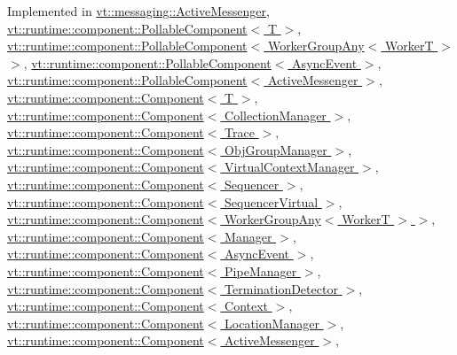 Implemented in \hyperlink{structvt_1_1messaging_1_1_active_messenger_a4cd83c125e144ecbd9425fa7cd194538}{vt\+::messaging\+::\+Active\+Messenger}, \hyperlink{structvt_1_1runtime_1_1component_1_1_pollable_component_a34cad810026224d550cd9b0c9d1eff22}{vt\+::runtime\+::component\+::\+Pollable\+Component$<$ T $>$}, \hyperlink{structvt_1_1runtime_1_1component_1_1_pollable_component_a34cad810026224d550cd9b0c9d1eff22}{vt\+::runtime\+::component\+::\+Pollable\+Component$<$ Worker\+Group\+Any$<$ Worker\+T $>$ $>$}, \hyperlink{structvt_1_1runtime_1_1component_1_1_pollable_component_a34cad810026224d550cd9b0c9d1eff22}{vt\+::runtime\+::component\+::\+Pollable\+Component$<$ Async\+Event $>$}, \hyperlink{structvt_1_1runtime_1_1component_1_1_pollable_component_a34cad810026224d550cd9b0c9d1eff22}{vt\+::runtime\+::component\+::\+Pollable\+Component$<$ Active\+Messenger $>$}, \hyperlink{structvt_1_1runtime_1_1component_1_1_component_a1dab11d9eb5bed8dfd5a3bb8fdf67f5a}{vt\+::runtime\+::component\+::\+Component$<$ T $>$}, \hyperlink{structvt_1_1runtime_1_1component_1_1_component_a1dab11d9eb5bed8dfd5a3bb8fdf67f5a}{vt\+::runtime\+::component\+::\+Component$<$ Collection\+Manager $>$}, \hyperlink{structvt_1_1runtime_1_1component_1_1_component_a1dab11d9eb5bed8dfd5a3bb8fdf67f5a}{vt\+::runtime\+::component\+::\+Component$<$ Trace $>$}, \hyperlink{structvt_1_1runtime_1_1component_1_1_component_a1dab11d9eb5bed8dfd5a3bb8fdf67f5a}{vt\+::runtime\+::component\+::\+Component$<$ Obj\+Group\+Manager $>$}, \hyperlink{structvt_1_1runtime_1_1component_1_1_component_a1dab11d9eb5bed8dfd5a3bb8fdf67f5a}{vt\+::runtime\+::component\+::\+Component$<$ Virtual\+Context\+Manager $>$}, \hyperlink{structvt_1_1runtime_1_1component_1_1_component_a1dab11d9eb5bed8dfd5a3bb8fdf67f5a}{vt\+::runtime\+::component\+::\+Component$<$ Sequencer $>$}, \hyperlink{structvt_1_1runtime_1_1component_1_1_component_a1dab11d9eb5bed8dfd5a3bb8fdf67f5a}{vt\+::runtime\+::component\+::\+Component$<$ Sequencer\+Virtual $>$}, \hyperlink{structvt_1_1runtime_1_1component_1_1_component_a1dab11d9eb5bed8dfd5a3bb8fdf67f5a}{vt\+::runtime\+::component\+::\+Component$<$ Worker\+Group\+Any$<$ Worker\+T $>$ $>$}, \hyperlink{structvt_1_1runtime_1_1component_1_1_component_a1dab11d9eb5bed8dfd5a3bb8fdf67f5a}{vt\+::runtime\+::component\+::\+Component$<$ Manager $>$}, \hyperlink{structvt_1_1runtime_1_1component_1_1_component_a1dab11d9eb5bed8dfd5a3bb8fdf67f5a}{vt\+::runtime\+::component\+::\+Component$<$ Async\+Event $>$}, \hyperlink{structvt_1_1runtime_1_1component_1_1_component_a1dab11d9eb5bed8dfd5a3bb8fdf67f5a}{vt\+::runtime\+::component\+::\+Component$<$ Pipe\+Manager $>$}, \hyperlink{structvt_1_1runtime_1_1component_1_1_component_a1dab11d9eb5bed8dfd5a3bb8fdf67f5a}{vt\+::runtime\+::component\+::\+Component$<$ Termination\+Detector $>$}, \hyperlink{structvt_1_1runtime_1_1component_1_1_component_a1dab11d9eb5bed8dfd5a3bb8fdf67f5a}{vt\+::runtime\+::component\+::\+Component$<$ Context $>$}, \hyperlink{structvt_1_1runtime_1_1component_1_1_component_a1dab11d9eb5bed8dfd5a3bb8fdf67f5a}{vt\+::runtime\+::component\+::\+Component$<$ Location\+Manager $>$}, \hyperlink{structvt_1_1runtime_1_1component_1_1_component_a1dab11d9eb5bed8dfd5a3bb8fdf67f5a}{vt\+::runtime\+::component\+::\+Component$<$ Active\+Messenger $>$}, 